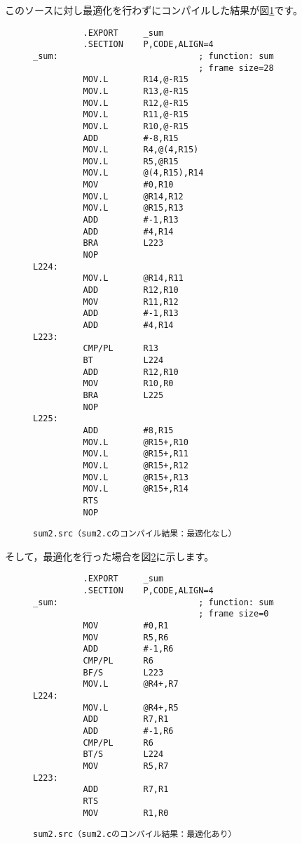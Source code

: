 \documentclass[a4j,10pt,fleqn]{jsarticle}
\begin{document}
このソースに対し最適化を行わずにコンパイルした結果が図\ref{fig:sum2.src}です。
\begin{figure}[tpb]
\begin{boxnote}
{\small\begin{verbatim}
          .EXPORT     _sum
          .SECTION    P,CODE,ALIGN=4
_sum:                            ; function: sum
                                 ; frame size=28
          MOV.L       R14,@-R15
          MOV.L       R13,@-R15
          MOV.L       R12,@-R15
          MOV.L       R11,@-R15
          MOV.L       R10,@-R15
          ADD         #-8,R15
          MOV.L       R4,@(4,R15)
          MOV.L       R5,@R15
          MOV.L       @(4,R15),R14
          MOV         #0,R10
          MOV.L       @R14,R12
          MOV.L       @R15,R13
          ADD         #-1,R13
          ADD         #4,R14
          BRA         L223
          NOP
L224:
          MOV.L       @R14,R11
          ADD         R12,R10
          MOV         R11,R12
          ADD         #-1,R13
          ADD         #4,R14
L223:
          CMP/PL      R13
          BT          L224
          ADD         R12,R10
          MOV         R10,R0
          BRA         L225
          NOP
L225:
          ADD         #8,R15
          MOV.L       @R15+,R10
          MOV.L       @R15+,R11
          MOV.L       @R15+,R12
          MOV.L       @R15+,R13
          MOV.L       @R15+,R14
          RTS
          NOP
\end{verbatim}}
\end{boxnote}
\caption{\texttt{sum2.src（sum2.cのコンパイル結果：最適化なし）}} \label{fig:sum2.src}
\end{figure}
そして，最適化を行った場合を図\ref{fig:sum2_op.src}に示します。
\begin{figure}[tpb]
\begin{boxnote}
{\small\begin{verbatim}
          .EXPORT     _sum
          .SECTION    P,CODE,ALIGN=4
_sum:                            ; function: sum
                                 ; frame size=0
          MOV         #0,R1
          MOV         R5,R6
          ADD         #-1,R6
          CMP/PL      R6
          BF/S        L223
          MOV.L       @R4+,R7
L224:
          MOV.L       @R4+,R5
          ADD         R7,R1
          ADD         #-1,R6
          CMP/PL      R6
          BT/S        L224
          MOV         R5,R7
L223:
          ADD         R7,R1
          RTS
          MOV         R1,R0
\end{verbatim}}
\end{boxnote}
\caption{\texttt{sum2.src（sum2.cのコンパイル結果：最適化あり）}} \label{fig:sum2_op.src}
\end{figure}
\end{document}
